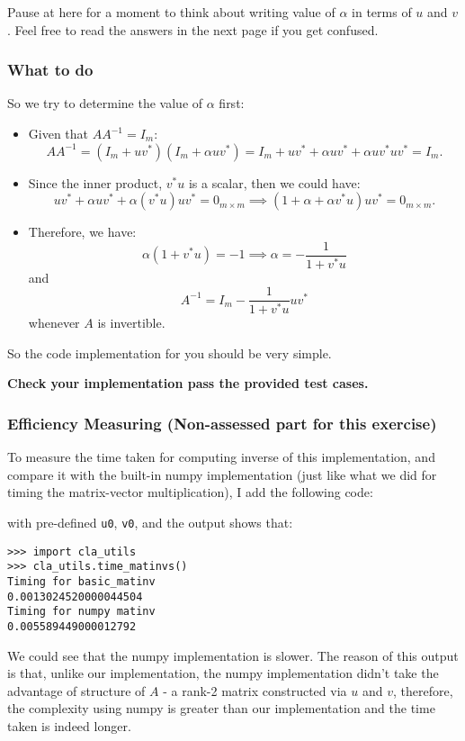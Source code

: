\noindent Pause at here for a moment to think about writing value of \(\alpha\) in terms of \(u\) and \(v\). Feel free to read the answers in the next page if you get confused.
\newpage
\subsubsection*{What to do}
\noindent So we try to determine the value of $\alpha$ first:
\begin{itemize}
  \item Given that $A A^{-1} = I_m$:
    \[
      A A^{-1} = (I_m + u v^{*})(I_m + \alpha u v^{*}) = I_m + uv^{*} + \alpha uv^{*} + \alpha u v^{*}uv^{*} = I_m
    .\]
  \item Since the inner product, $v^{*}u$ is a scalar, then we could have:
    \[
      uv^{*} + \alpha uv^{*} + \alpha (v^{*}u)uv^{*} = 0_{m \times m} \implies (1 + \alpha + \alpha v^{*}u)uv^{*} = 0_{m \times m}
    .\]
  \item Therefore, we have:
    \[
    \alpha (1 + v^{*}u) = -1 \implies \alpha = -\frac{1}{1 + v^{*}u}
    \]
    and
    \[
    A^{-1} = I_m -\frac{1}{1 + v^{*}u} uv^{*}
    \]
    whenever $A$ is invertible.
\end{itemize}
So the code implementation for you should be very simple. \checked \medskip

\noindent \textbf{Check your implementation pass the provided test cases.}
\subsubsection*{Efficiency Measuring (Non-assessed part for this exercise)}
To measure the time taken for computing inverse of this implementation, and compare it with the built-in numpy implementation (just like what we did for timing the matrix-vector multiplication), I add the following code:

with pre-defined \texttt{u0}, \texttt{v0}, and the output shows that:
\begin{lstlisting}
>>> import cla_utils
>>> cla_utils.time_matinvs()
Timing for basic_matinv
0.0013024520000044504
Timing for numpy matinv
0.005589449000012792
\end{lstlisting}

\noindent We could see that the numpy implementation is slower. The reason of this output is that, unlike our implementation, the numpy implementation didn't take the advantage of structure of \(A\) - a rank-2 matrix constructed via \(u\) and \(v\), therefore, the complexity using numpy is greater than our implementation and the time taken is indeed longer.

